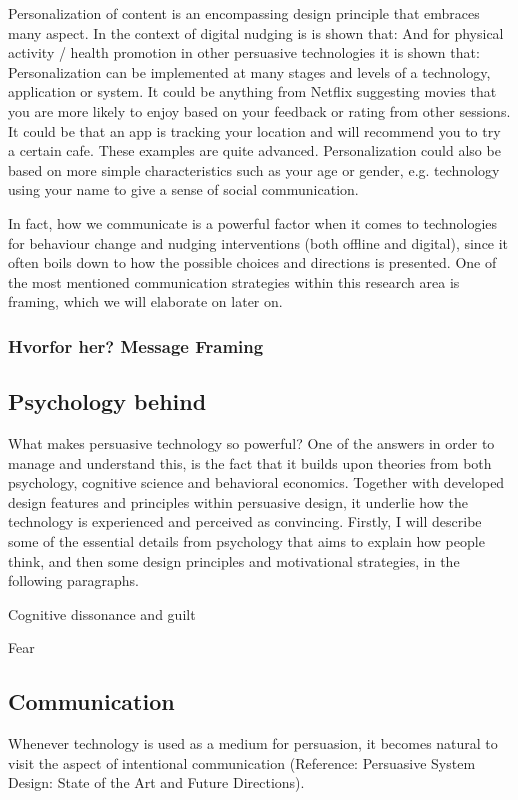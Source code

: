 {Personalization of content is an encompassing design principle that embraces many aspect. In the context of digital nudging is is shown that: 
And for physical activity / health promotion in other persuasive technologies it is shown that: 
Personalization can be implemented at many stages and levels of a technology, application or system. It could be anything from Netflix suggesting movies that you are more likely to enjoy based on your feedback or rating from other sessions. It could be that an app is tracking your location and will recommend you to try a certain cafe. These examples are quite advanced. Personalization could also be based on more simple characteristics such as your age or gender, e.g. technology using your name to give a sense of social communication. 

In fact, how we communicate is a powerful factor when it comes to technologies for behaviour change and nudging interventions (both offline and digital), since it often boils down to how the possible choices and directions is presented. One of the most mentioned communication strategies within this research area is framing, which we will elaborate on later on. 

\subsubsection{Hvorfor her? Message Framing}



\subsection{Psychology behind}
What makes persuasive technology so powerful? One of the answers in order to manage and understand this, is the fact that it builds upon theories from both psychology, cognitive science and behavioral economics. Together with developed design features and principles within persuasive design, it underlie how the technology is experienced and perceived as convincing. Firstly, I will describe some of the essential details from psychology that aims to explain how people think, and then some design principles and motivational strategies, in the following paragraphs. 

Cognitive dissonance and guilt

Fear

\subsection{Communication}
Whenever technology is used as a medium for persuasion, it becomes natural to visit the aspect of intentional communication (Reference: Persuasive System Design: State of the Art and Future Directions). 

}
